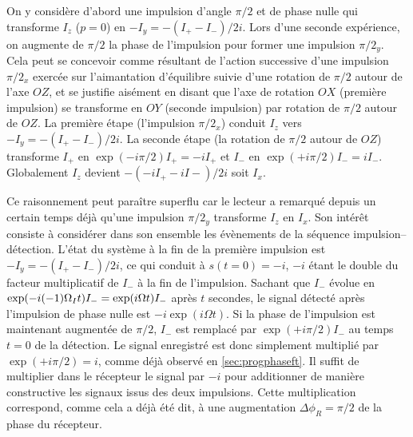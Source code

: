 On y considère d'abord une impulsion d'angle $\pi/2$ et de phase 
nulle qui transforme $I_z$ ($p=0$) en $-I_y = -(I_+ - I_-)/2i$. 
Lors d'une seconde expérience, on augmente de $\pi/2$ la phase de 
l'impulsion pour former une impulsion $\pi/2_y$.
Cela peut se concevoir comme résultant de l'action successive
d'une impulsion $\pi/2_x$ exercée sur l'aimantation d'équilibre
suivie d'une rotation de $\pi/2$ autour de l'axe $OZ$,
et se justifie aisément en disant que l'axe de rotation $OX$ (première impulsion)
se transforme en $OY$ (seconde impulsion) par rotation de $\pi/2$
autour de $OZ$.
La première étape (l'impulsion $\pi/2_x$) conduit $I_z$ vers $-I_y = -(I_+ - I_-)/2i$.
La seconde étape (la rotation de $\pi/2$ autour de $OZ$)
transforme $I_+$ en $\exp(-i\pi/2) I_+ = -iI_+$
et $I_-$ en $\exp(+i\pi/2) I_- = iI_-$.
Globalement $I_z$ devient $-(-iI_+ - iI-)/2i$ soit $I_x$.

Ce raisonnement peut paraître superflu car le lecteur a remarqué depuis
un certain temps déjà qu'une impulsion $\pi/2_y$ transforme $I_z$ en $I_x$.
Son intérêt consiste à considérer dans son ensemble
les évènements de la séquence impulsion--détection.
L'état du système à la fin de la première impulsion est $-I_y = -(I_+ - I_-)/2i$,
ce qui conduit à $s(t=0)=-i$,
$-i$ étant le double du facteur multiplicatif de $I_-$ à la fin de l'impulsion.
Sachant que $I_-$ évolue en $\exp(-i(-1)\Omega_I t)I_- = \exp(i\Omega t)I_-$ 
après $t$ secondes,
le signal détecté après l'impulsion de phase nulle est $-i\exp(i\Omega t)$.
Si la phase de l'impulsion est maintenant augmentée de $\pi/2$, $I_-$ est remplacé
par $\exp(+i\pi/2) I_-$ au temps $t=0$ de la détection.
Le signal enregistré est donc simplement multiplié par $\exp(+i\pi/2) = i$,
comme déjà observé en \ref{sec:progphaseft}.
Il suffit de multiplier dans le récepteur le signal par $-i$ pour additionner
de manière constructive les signaux issus des deux impulsions.
Cette multiplication correspond, comme cela a déjà été dit, à une augmentation
$\Delta\phi_R = \pi/2$ de la phase du récepteur.

